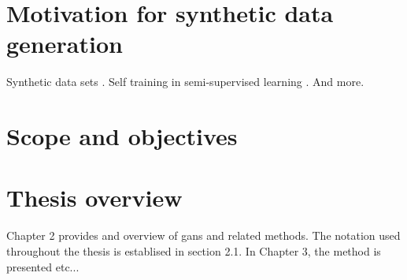 \section{Motivation for synthetic data generation}
Synthetic data sets \textcite{patki2016synthetic}. Self training in semi-supervised learning \parencite{wuliu2017selftrainsemisup}. And more.

\section{Scope and objectives}

\section{Thesis overview}
Chapter 2 provides and overview of \acrlong{gans} and related methods. The notation used throughout the thesis is establised in section 2.1. In Chapter 3, the method is presented etc...




